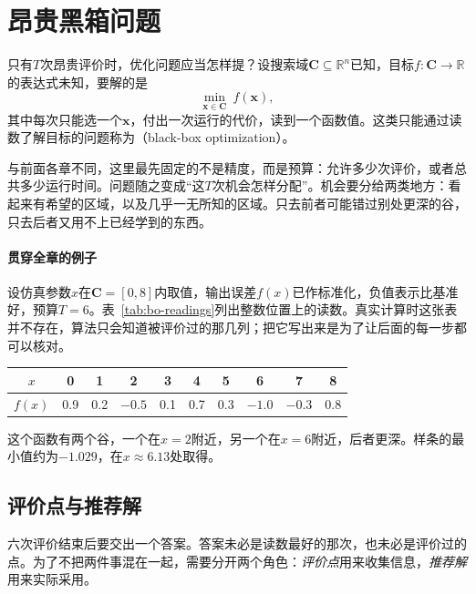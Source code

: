 \section{昂贵黑箱问题}
\label{sec:bo-problem}

只有$T$次昂贵评价时，优化问题应当怎样提？设搜索域$\bm{C}\subseteq\mathbb{R}^n$已知，目标$f:\bm{C}\to\mathbb{R}$的表达式未知，要解的是
\begin{equation}
 \min_{\bm{x}\in\bm{C}}\ f(\bm{x}),
 \label{eq:bo-problem}
\end{equation}
其中每次只能选一个$\bm{x}$，付出一次运行的代价，读到一个函数值。这类只能通过读数了解目标的问题称为（black-box optimization）。

与前面各章不同，这里最先固定的不是精度，而是预算：允许多少次评价，或者总共多少运行时间。问题随之变成“这$T$次机会怎样分配”。机会要分给两类地方：看起来有希望的区域，以及几乎一无所知的区域。只去前者可能错过别处更深的谷，只去后者又用不上已经学到的东西。

\paragraph{贯穿全章的例子}
设仿真参数$x$在$\bm{C}=[0,8]$内取值，输出误差$f(x)$已作标准化，负值表示比基准好，预算$T=6$。表~\ref{tab:bo-readings}列出整数位置上的读数。真实计算时这张表并不存在，算法只会知道被评价过的那几列；把它写出来是为了让后面的每一步都可以核对。

\begin{BookInlineTable}
 \centering
 \caption{贯穿例的整数位置读数。函数$f$是过这九个点的自然三次样条，只作为教学假设，算法不知道它。}
 \label{tab:bo-readings}
 \begin{tabular}{cccccccccc}
 \toprule
 $x$&0&1&2&3&4&5&6&7&8\\
 \midrule
 $f(x)$&0.9&0.2&$-0.5$&0.1&0.7&0.3&$-1.0$&$-0.3$&0.8\\
 \bottomrule
 \end{tabular}
\end{BookInlineTable}

这个函数有两个谷，一个在$x=2$附近，另一个在$x=6$附近，后者更深。样条的最小值约为$-1.029$，在$x\approx6.13$处取得。

\subsection{评价点与推荐解}
\label{sec:bo-query-recommend}

六次评价结束后要交出一个答案。答案未必是读数最好的那次，也未必是评价过的点。为了不把两件事混在一起，需要分开两个角色：\emph{评价点}用来收集信息，\emph{推荐解}用来实际采用。

